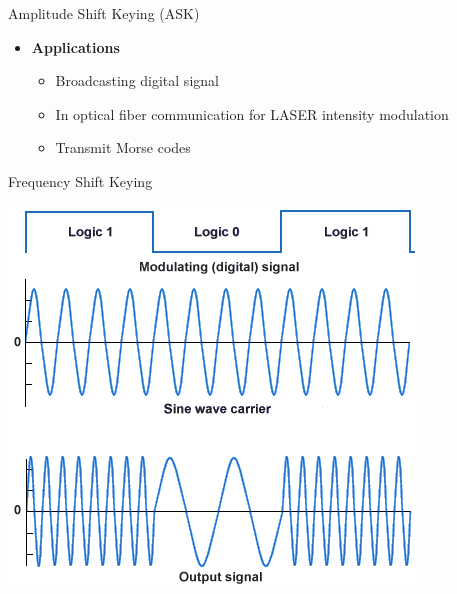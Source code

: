 \documentclass{beamer}
\begin{document}
	
	\begin{frame}{Amplitude Shift Keying (ASK)}
		\begin{itemize}
			\onslide\item<1->\textbf{Applications}
			\begin{itemize}
				\onslide\item<2-> Broadcasting digital signal
				\onslide\item<3-> In optical fiber communication for LASER intensity modulation
				\onslide\item<4-> Transmit Morse codes
			\end{itemize}
		\end{itemize}
	\end{frame}
	
	
	\begin{frame}{Frequency Shift Keying}
		\begin{center}
			\includegraphics[scale=0.5]{2.png}
		\end{center}
		
	\end{frame}
	
\end{document}
